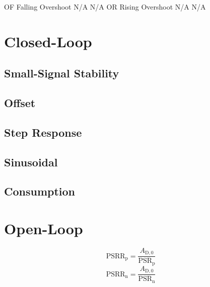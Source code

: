 \documentclass{article}[11pt]
\begin{document}
OF  Falling Overshoot   N/A   N/A\label{sec:cl:sim}
OR  Rising Overshoot  N/A   N/A



\section{Closed-Loop}\label{sec:cl}
\cite{bsim480-man}
\subsection{Small-Signal Stability}\label{sec:cl:stab}

\subsection{Offset}\label{sec:cl:offset}

\subsection{Step Response}\label{sec:cl:slew}

\subsection{Sinusoidal}\label{sec:cl:sin}

\subsection{Consumption}\label{sec:cl:cons}

\section{Open-Loop}\label{sec:ol}

\begin{equation}
\mathrm{PSRR}_{\mathrm{p}} = \frac{A_{\mathrm{D,0}}}{\mathrm{PSR}_{\mathrm{p}}}
\end{equation}
\begin{equation}
\mathrm{PSRR}_{\mathrm{n}} = \frac{A_{\mathrm{D,0}}}{\mathrm{PSR}_{\mathrm{n}}}
\end{equation}

\cite{binkley-tradeoff-08,toumazou-tradeoff-07}

\printbibliography
\end{document}
